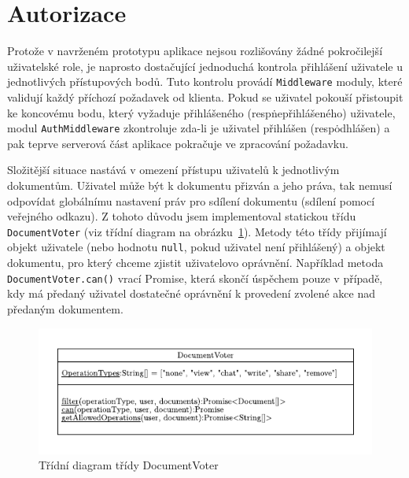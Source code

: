 
\section{Autorizace}\label{sec:autorizace}

Protože v navrženém prototypu aplikace nejsou rozlišovány žádné pokročilejší uživatelské role, je naprosto dostačující jednoduchá kontrola přihlášení uživatele u jednotlivých přístupových bodů.
Tuto kontrolu provádí \texttt{Middleware} moduly, které validují každý příchozí požadavek od klienta.
Pokud se uživatel pokouší přistoupit ke koncovému bodu, který vyžaduje přihlášeného (resp\. nepřihlášeného) uživatele, modul \texttt{AuthMiddleware} zkontroluje zda-li je uživatel přihlášen (resp\. odhlášen) a pak teprve serverová část aplikace pokračuje ve zpracování požadavku.

Složitější situace nastává v omezení přístupu uživatelů k jednotlivým dokumentům.
Uživatel může být k dokumentu přizván a jeho práva, tak nemusí odpovídat globálnímu nastavení práv pro sdílení dokumentu (sdílení pomocí veřejného odkazu).
Z tohoto důvodu jsem implementoval statickou třídu \texttt{DocumentVoter} (viz třídní diagram na obrázku~\ref{fig:DocumentVoter}).
Metody této třídy přijímají objekt uživatele (nebo hodnotu \texttt{null}, pokud uživatel není přihlášený) a objekt dokumentu, pro který chceme zjistit uživatelovo oprávnění.
Například metoda \texttt{DocumentVoter.can()} vrací Promise, která skončí úspěchem pouze v případě, kdy má předaný uživatel dostatečné oprávnění k provedení zvolené akce nad předaným dokumentem.

\begin{figure}[ht!]
    \centering
    \includegraphics[width=\textwidth]{partials/realizace/DocumentVoter.pdf}
    \caption{Třídní diagram třídy DocumentVoter}\label{fig:DocumentVoter}
\end{figure}


